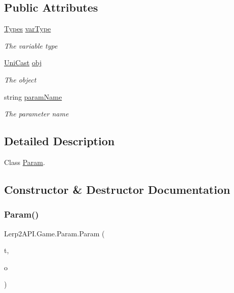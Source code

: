 \subsection*{Public Attributes}
\begin{DoxyCompactItemize}
\item 
\hyperlink{namespace_lerp2_a_p_i_1_1_game_a2f182da062f210cc43f341f6992ee293}{Types} \hyperlink{class_lerp2_a_p_i_1_1_game_1_1_param_a44e4fd6a863695d5e967f8132a8a9d33}{var\+Type}
\begin{DoxyCompactList}\small\item\em The variable type \end{DoxyCompactList}\item 
\hyperlink{class_lerp2_a_p_i_1_1_game_1_1_uni_cast}{Uni\+Cast} \hyperlink{class_lerp2_a_p_i_1_1_game_1_1_param_a1574efce7c2c1d3b834d95a55dc99185}{obj}
\begin{DoxyCompactList}\small\item\em The object \end{DoxyCompactList}\item 
string \hyperlink{class_lerp2_a_p_i_1_1_game_1_1_param_ae34f6415c4b58bfc604466c2250ba05c}{param\+Name}
\begin{DoxyCompactList}\small\item\em The parameter name \end{DoxyCompactList}\end{DoxyCompactItemize}


\subsection{Detailed Description}
Class \hyperlink{class_lerp2_a_p_i_1_1_game_1_1_param}{Param}. 



\subsection{Constructor \& Destructor Documentation}
\mbox{\label{class_lerp2_a_p_i_1_1_game_1_1_param_adc3bb5d52ed368ba50e1975c68216c78}} 
\subsubsection{\texorpdfstring{Param()}{Param()}\hspace{0.1cm}{\footnotesize\ttfamily [1/2]}}
{\footnotesize\ttfamily Lerp2\+A\+P\+I.\+Game.\+Param.\+Param (\begin{DoxyParamCaption}\item[{\hyperlink{namespace_lerp2_a_p_i_1_1_game_a2f182da062f210cc43f341f6992ee293}{Types}}]{t,  }\item[{\hyperlink{class_lerp2_a_p_i_1_1_game_1_1_uni_cast}{Uni\+Cast}}]{o }\end{DoxyParamCaption})\hspace{0.3cm}{\ttfamily [inline]}}



